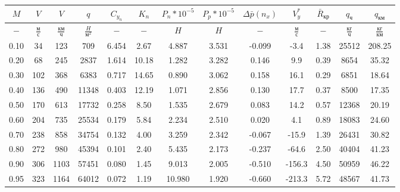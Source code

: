 \begin{tabular}{|c|c|c|c|c|c|c|c|c|c|c|c|c|}
\hline
$M$ & $V$ & $V$ & $q$ & $C_{y_n}$ & $K_n$ & $P_n*10^{-5}$ & $P_p*10^{-5}$ & $\Delta \bar{p}(n_x)$ & $V_y^*$ & $\bar{R}_{кр}$ & $q_{ч}$ & $q_{км}$ \\ 
\hline
$-$ & $\frac{м}{с}$ & $\frac{км}{ч}$ & $\frac{H}{м^2}$ & $-$ & $-$ & $H$ & $H$ & $-$ & $\frac{м}{с}$ & $-$ & $\frac{кг}{ч}$ & $\frac{кг}{км}$ \\ 
\hline
0.10 & 34 & 123 & 709 & 6.454 & 2.67 & 4.887 & 3.531 & -0.099 & -3.4 & 1.38 & 25512 & 208.25 \\ 
\hline
0.20 & 68 & 245 & 2837 & 1.614 & 10.18 & 1.282 & 3.282 & 0.146 & 9.9 & 0.39 & 8654 & 35.32 \\ 
\hline
0.30 & 102 & 368 & 6383 & 0.717 & 14.65 & 0.890 & 3.062 & 0.158 & 16.1 & 0.29 & 6851 & 18.64 \\ 
\hline
0.40 & 136 & 490 & 11348 & 0.403 & 12.19 & 1.071 & 2.856 & 0.130 & 17.7 & 0.37 & 8500 & 17.35 \\ 
\hline
0.50 & 170 & 613 & 17732 & 0.258 & 8.50 & 1.535 & 2.679 & 0.083 & 14.2 & 0.57 & 12368 & 20.19 \\ 
\hline
0.60 & 204 & 735 & 25534 & 0.179 & 5.84 & 2.234 & 2.510 & 0.020 & 4.1 & 0.89 & 18083 & 24.60 \\ 
\hline
0.70 & 238 & 858 & 34754 & 0.132 & 4.00 & 3.259 & 2.342 & -0.067 & -15.9 & 1.39 & 26431 & 30.82 \\ 
\hline
0.80 & 272 & 980 & 45394 & 0.101 & 2.40 & 5.435 & 2.173 & -0.237 & -64.6 & 2.50 & 40404 & 41.23 \\ 
\hline
0.90 & 306 & 1103 & 57451 & 0.080 & 1.45 & 9.013 & 2.005 & -0.510 & -156.3 & 4.50 & 50959 & 46.22 \\ 
\hline
0.95 & 323 & 1164 & 64012 & 0.072 & 1.19 & 10.980 & 1.920 & -0.660 & -213.3 & 5.72 & 48567 & 41.73 \\ 
\hline
\end{tabular}